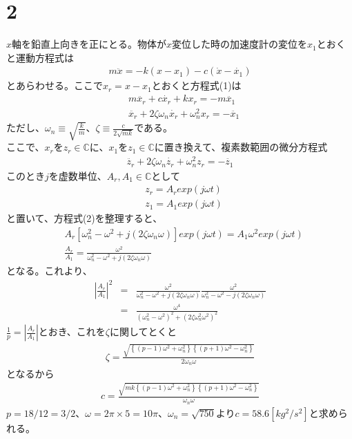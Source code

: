 \documentclass[pdflatex,ja=standard,fleqn]{bxjsarticle}
\begin{document}
\section*{2}
$x$軸を鉛直上向きを正にとる。物体が$x$変位した時の加速度計の変位を$x_{1}$とおくと運動方程式は
\begin{eqnarray}
    m\ddot{x}=-k(x-x_{1})-c(\dot{x}-\dot{x_{1}})
\end{eqnarray}
とあらわせる。ここで$x_{r}=x-x_{1}$とおくと方程式(1)は
\begin{align*}
    &m\ddot{x_{r}}+c\dot{x_{r}}+kx_{r}=-m\ddot{x_{1}}\\
    &\ddot{x_{r}}+2\zeta\omega_{n}\dot{x_{r}}+\omega_{n}^{2}x_{r}=-\ddot{x_{1}}
\end{align*}
ただし、$\omega_{n}\equiv\sqrt{\frac{k}{m}}$、$\zeta\equiv\frac{c}{2\sqrt{mk}}$である。\\
ここで、$x_{r}$を$z_{r}\in\mathbb{C}$に、$x_{1}$を$z_{1}\in\mathbb{C}$に置き換えて、複素数範囲の微分方程式
\begin{eqnarray}
    \ddot{z_{r}}+2\zeta\omega_{n}\dot{z_{r}}+\omega_{n}^{2}z_{r}=-\ddot{z_{1}}
\end{eqnarray}
このとき$j$を虚数単位、$A_{r},A_{1}\in\mathbb{C}$として
\begin{align*}
    &z_{r}=A_{r}exp(j\omega t)\\
    &z_{1}=A_{1}exp(j\omega t)
\end{align*}
と置いて、方程式(2)を整理すると、
\begin{align*}
    &A_{r}\left[\omega_{n}^{2}-\omega^{2}+j(2\zeta\omega_{n}\omega)\right]exp(j\omega t)=A_{1}\omega^{2}exp(j\omega t)\\
    &\frac{A_{r}}{A_{1}}=\frac{\omega^{2}}{\omega_{n}^{2}-\omega^{2}+j(2\zeta\omega_{n}\omega)}
\end{align*}
となる。これより、
\begin{eqnarray*}
    \left|\frac{A_{r}}{A_{1}}\right|^{2}&=&\frac{\omega^{2}}{\omega_{n}^{2}-\omega^{2}+j(2\zeta\omega_{n}\omega)}\frac{\omega^{2}}{\omega_{n}^{2}-\omega^{2}-j(2\zeta\omega_{n}\omega)}\\
    &=&\frac{\omega^{4}}{(\omega_{n}^{2}-\omega^{2})^{2}+(2\zeta\omega_{n}^{2}\omega^{2})^{2}}
\end{eqnarray*}
$\frac{1}{p}=|\frac{A_{r}}{A_{1}}|$とおき、これを$\zeta$に関してとくと
\begin{eqnarray*}
    \zeta=\frac{\sqrt{\left\{(p-1)\omega^{2}+\omega_{n}^{2}\right\}\left\{(p+1)\omega^{2}-\omega_{n}^{2}\right\}}}{2\omega_{n}\omega}
\end{eqnarray*}
となるから
\begin{eqnarray*}
    c=\frac{\sqrt{mk\left\{(p-1)\omega^{2}+\omega_{n}^{2}\right\}\left\{(p+1)\omega^{2}-\omega_{n}^{2}\right\}}}{\omega_{n}\omega}
\end{eqnarray*}
$p=18/12=3/2$、$\omega=2\pi×5=10\pi$、$\omega_{n}=\sqrt{750}$より$c=58.6[kg^{2}/s^{2}]$と求められる。
\end{document}
